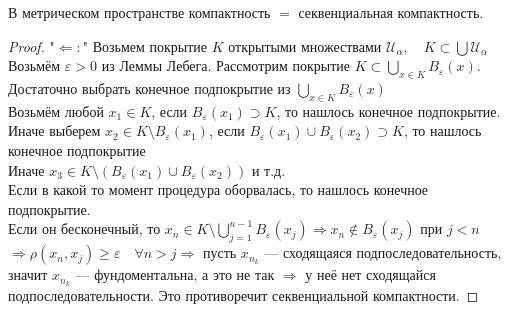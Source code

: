 \begin{theorem-non}
    В метрическом пространстве компактность $=$ секвенциальная компактность.
    \begin{proof}
        "$\Longleftarrow:$" Возьмем покрытие $K$ открытыми множествами $\mathcal{U_{\alpha}}, \quad K \subset \bigcup \mathcal{U_{\alpha}}$ \\
        Возьмём $\varepsilon > 0$ из Леммы Лебега. Рассмотрим покрытие $K \subset \bigcup\limits_{x \in K} B_{\varepsilon}(x)$. \\
        Достаточно выбрать конечное подпокрытие из $\bigcup\limits_{x \in K}B_{\varepsilon}(x)$ \\
        Возьмём любой $x_1 \in K$, если $B_{\varepsilon}(x_1) \supset K$, то нашлось конечное подпокрытие. \\
        Иначе выберем $x_2 \in K \setminus B_{\varepsilon}(x_1)$, если $B_{\varepsilon}(x_1) \cup B_{\varepsilon}(x_2) \supset K$, то нашлось конечное подпокрытие \\
        Иначе $x_3 \in K \setminus (B_{\varepsilon}(x_1) \cup B_{\varepsilon}(x_2))$ и т.д.  \\
        Если в какой то момент процедура оборвалась, то нашлось конечное подпокрытие. \\
        Если он бесконечный, то $x_n \in K \setminus \bigcup\limits_{j = 1}^{n - 1} B_{\varepsilon}(x_j) \Longrightarrow x_n \notin B_{\varepsilon}(x_j)$ при $j < n$ 
        $\Longrightarrow \rho(x_n, x_j) \geqslant \varepsilon \quad \forall n > j \Longrightarrow$ пусть $x_{n_k}$ --- сходящаяся подпоследовательность, значит $x_{n_k}$ --- фундоментальна, а это не так
        $\Longrightarrow$ у неё нет сходящайся подпоследовательности. Это противоречит секвенциальной компактности.
    \end{proof}
\end{theorem-non}

